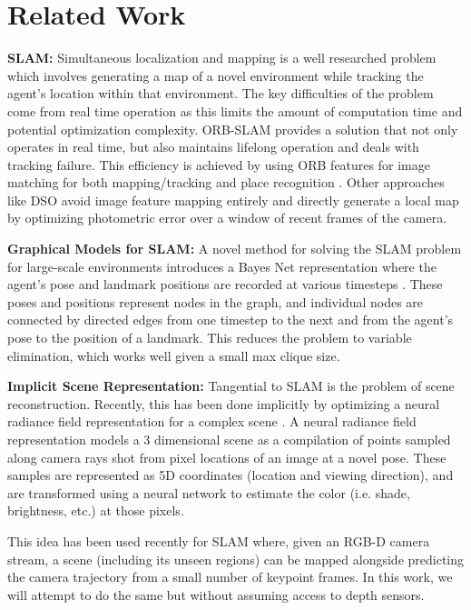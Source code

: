 \documentclass[15pt,letterpaper]{article}
\begin{document}
\section{Related Work}%
\label{sec:Related Work}
{\bf SLAM:}
Simultaneous localization and mapping is a well researched problem which involves generating a map of a novel environment while tracking the agent's location within that environment. The key difficulties of the problem come from real time operation as this limits the amount of computation time and potential optimization complexity. ORB-SLAM \cite{orb_slam} provides a solution that not only operates in real time, but also maintains lifelong operation and deals with tracking failure. This efficiency is achieved by using ORB features for image matching for both mapping/tracking and place recognition \cite{orb}. Other approaches like DSO \cite{direct_odometry} avoid image feature mapping entirely and directly generate a local map by optimizing photometric error over a window of recent frames of the camera.

{\bf Graphical Models for SLAM:}
A novel method for solving the SLAM problem for large-scale environments introduces a Bayes Net representation where the agent's pose and landmark positions are recorded at various timesteps \cite{isam2}. These poses and positions represent nodes in the graph, and individual nodes are connected by directed edges from one timestep to the next and from the agent's pose to the position of a landmark. This reduces the problem to variable elimination, which works well given a small max clique size.

{\bf Implicit Scene Representation:}
Tangential to SLAM is the problem of scene reconstruction. Recently, this has been done implicitly by optimizing a neural radiance field representation for a complex scene \cite{nerf}. A neural radiance field representation models a 3 dimensional scene as a compilation of points sampled along camera rays shot from pixel locations of an image at a novel pose. These samples are represented as 5D coordinates (location and viewing direction), and are transformed using a neural network to estimate the color (i.e. shade, brightness, etc.) at those pixels.

This idea has been used recently for SLAM \cite{imap} where, given an RGB-D camera stream, a scene (including its unseen regions) can be mapped alongside predicting the camera trajectory from a small number of keypoint frames. In this work, we will attempt to do the same but without assuming access to depth sensors.
\end{document}
